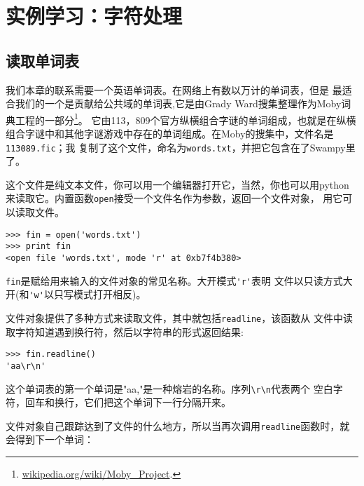 \chapter{实例学习：字符处理}

\section{读取单词表}
\label{wordlist}

我们本章的联系需要一个英语单词表。在网络上有数以万计的单词表，但是
最适合我们的一个是贡献给公共域的单词表,它是由Grady Ward搜集整理作为Moby词典工程的一部分\footnote{\url{wikipedia.org/wiki/Moby_Project}.}。
它由113，809个官方纵横组合字谜的单词组成，也就是在纵横组合字谜中和其他字谜游戏中存在的单词组成。在Moby的搜集中，文件名是{\tt 113089.fic}；我
复制了这个文件，命名为{\tt words.txt}，并把它包含在了Swampy里了。



这个文件是纯文本文件，你可以用一个编辑器打开它，当然，你也可以用python
来读取它。内置函数{\tt open}接受一个文件名作为参数，返回一个文件对象，
用它可以读取文件。


\beforeverb
\begin{verbatim}
>>> fin = open('words.txt')
>>> print fin
<open file 'words.txt', mode 'r' at 0xb7f4b380>
\end{verbatim}
\afterverb

{\tt fin}是赋给用来输入的文件对象的常见名称。大开模式\verb"'r'"表明
文件以只读方式大开(和\verb"'w'"以只写模式打开相反)。


文件对象提供了多种方式来读取文件，其中就包括{\tt readline}，该函数从
文件中读取字符知道遇到换行符，然后以字符串的形式返回结果:

\beforeverb
\begin{verbatim}
>>> fin.readline()
'aa\r\n'
\end{verbatim}
\afterverb
%

这个单词表的第一个单词是"aa,"是一种熔岩的名称。序列\verb"\r\n"代表两个
空白字符，回车和换行，它们把这个单词下一行分隔开来。

文件对象自己跟踪达到了文件的什么地方，所以当再次调用{\tt readline}函数时，就会得到下一个单词：

